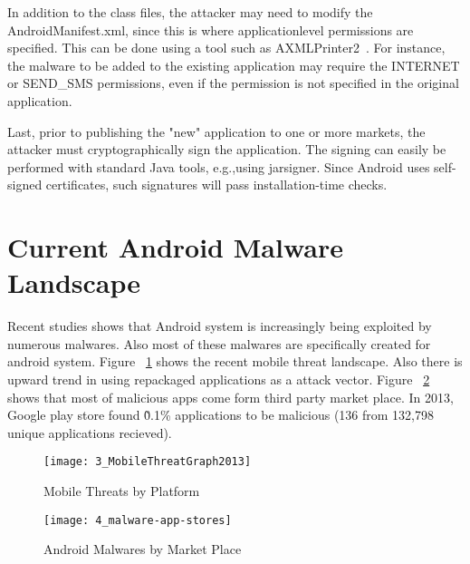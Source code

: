 In addition to the class files, the attacker may need to modify the AndroidManifest.xml, since this is where applicationlevel permissions are specified. This can be done using a tool such as AXMLPrinter2~\cite{64}. For instance, the malware to be added to the existing application may require the INTERNET or SEND\_SMS permissions, even if the permission is not specified in the original application.

Last, prior to publishing the "new" application to one or more markets, the attacker must cryptographically sign the application.
The signing can easily be performed with standard Java tools, e.g.,using jarsigner. Since Android uses self-signed certificates,
such signatures will pass installation-time checks.

\section{Current Android Malware Landscape}
\label{Current Android Malware Landscape}
Recent studies shows that Android system is increasingly being exploited by numerous malwares. Also most of these malwares are specifically created for android system. Figure ~\ref{fig:3_MobileThreatGraph2013} shows the recent mobile threat landscape. Also there is upward trend in using repackaged applications as a attack vector. Figure ~\ref{fig:4_malware-app-stores} shows that most of malicious apps come form third party market place. In 2013, Google play store found \~0.1\% applications to be malicious (136 from 132,798 unique applications recieved).

\begin{figure}
\centering
\texttt{[image: 3\_MobileThreatGraph2013]}
\caption{Mobile Threats by Platform}
\label{fig:3_MobileThreatGraph2013}
\end{figure}
\begin{figure}
\texttt{[image: 4\_malware-app-stores]}
\caption{Android Malwares by Market Place}
\label{fig:4_malware-app-stores}
\end{figure}

